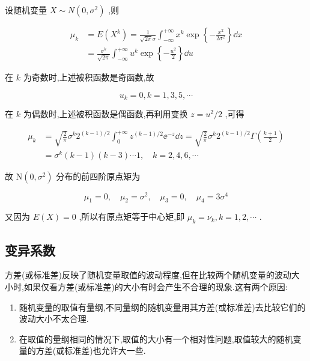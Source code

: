 \begin{example}\label{exam:2.7.1}
	设随机变量 $ X \sim N\left(0, \sigma^{2}\right) $ ,则
	
	\[
	\begin{aligned} 
	\mu_{k} &=E\left(X^{k}\right)=\frac{1}{\sqrt{2 \pi} \sigma} \int_{-\infty}^{+\infty} x^{k} \exp \left\{-\frac{x^{2}}{2 \sigma^{2}}\right\} \dd x \\ 
	&=\frac{\sigma^{k}}{\sqrt{2 \pi}} \int_{-\infty}^{+\infty} u^{k} \exp \left\{-\frac{u^{2}}{2}\right\} \dd u 
	\end{aligned}
	\]
	
	在 $ k $ 为奇数时,上述被积函数是奇函数,故
	
	\[
	u_{k}=0, k=1,3,5, \cdots
	\]
	
	在 $ k $ 为偶数时,上述被积函数是偶函数,再利用变换 $ z=u^{2} / 2 $ ,可得
	
	\[
	\begin{aligned} \mu_{k} &=\sqrt{\frac{2}{\pi}} \sigma^{k} 2^{(k-1) / 2} \int_{0}^{+\infty} z^{(k-1) / 2} \ee ^{-z} \dd z=\sqrt{\frac{2}{\pi}} \sigma^{k} 2^{(k-1) / 2} \Gamma\left(\frac{k+1}{2}\right) \\ &=\sigma^{k}(k-1)(k-3) \cdots 1, \quad k=2,4,6, \cdots \end{aligned}
	\]
	
	故 $ \mathrm{N}\left(0, \sigma^{2}\right) $ 分布的前四阶原点矩为
	
	\[
	\mu_{1}=0, \quad \mu_{2}=\sigma^{2}, \quad \mu_{3}=0, \quad \mu_{4}=3 \sigma^{4}
	\]
	
	又因为 $ E(X)=0 $ ,所以有原点矩等于中心矩,即 $ \mu_{k}=\nu_{k}, k=1,2, \cdots $ .
\end{example}

\subsection{变异系数}\label{ssec:2.7.2}

方差(或标准差)反映了随机变量取值的波动程度,但在比较两个随机变量的波动大小时,如果仅看方差(或标准差)的大小有时会产生不合理的现象.这有两个原因:

\begin{enumerate}
	\item 随机变量的取值有量纲,不同量纲的随机变量用其方差(或标准差)去比较它们的波动大小不太合理.
	\item 在取值的量纲相同的情况下,取值的大小有一个相对性问题,取值较大的随机变量的方差(或标准差)也允许大一些.
\end{enumerate}

